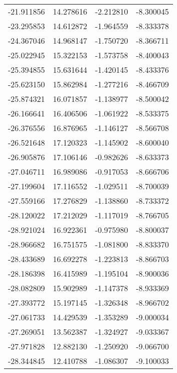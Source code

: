 \begin{tabular}{rrrr}
      -21.911856 &        14.278616 &   -2.212810 &  -8.300045 \\
      -23.295853 &        14.612872 &   -1.964559 &  -8.333378 \\
      -24.367046 &        14.968147 &   -1.750720 &  -8.366711 \\
      -25.022945 &        15.322153 &   -1.573758 &  -8.400043 \\
      -25.394855 &        15.631644 &   -1.420145 &  -8.433376 \\
      -25.623150 &        15.862984 &   -1.277216 &  -8.466709 \\
      -25.874321 &        16.071857 &   -1.138977 &  -8.500042 \\
      -26.166641 &        16.406506 &   -1.061922 &  -8.533375 \\
      -26.376556 &        16.876965 &   -1.146127 &  -8.566708 \\
      -26.521648 &        17.120323 &   -1.145902 &  -8.600040 \\
      -26.905876 &        17.106146 &   -0.982626 &  -8.633373 \\
      -27.046711 &        16.989086 &   -0.917053 &  -8.666706 \\
      -27.199604 &        17.116552 &   -1.029511 &  -8.700039 \\
      -27.559166 &        17.276829 &   -1.138860 &  -8.733372 \\
      -28.120022 &        17.212029 &   -1.117019 &  -8.766705 \\
      -28.921024 &        16.922361 &   -0.975980 &  -8.800037 \\
      -28.966682 &        16.751575 &   -1.081800 &  -8.833370 \\
      -28.433689 &        16.692278 &   -1.223813 &  -8.866703 \\
      -28.186398 &        16.415989 &   -1.195104 &  -8.900036 \\
      -28.082809 &        15.902989 &   -1.147378 &  -8.933369 \\
      -27.393772 &        15.197145 &   -1.326348 &  -8.966702 \\
      -27.061733 &        14.429539 &   -1.353289 &  -9.000034 \\
      -27.269051 &        13.562387 &   -1.324927 &  -9.033367 \\
      -27.971828 &        12.882130 &   -1.250920 &  -9.066700 \\
      -28.344845 &        12.410788 &   -1.086307 &  -9.100033 \\

\end{tabular}
